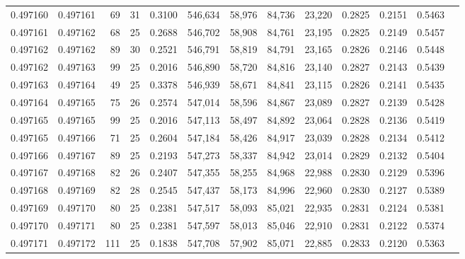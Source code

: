\begin{tabular}{rrrrrrrrrrrrr}
0.497160 & 0.497161 &  69 &  31 &                                     0.3100 & 546,634 &  58,976 &  84,736 &  23,220 & 0.2825 & 0.2151 & 0.5463 \\
0.497161 & 0.497162 &  68 &  25 &                                     0.2688 & 546,702 &  58,908 &  84,761 &  23,195 & 0.2825 & 0.2149 & 0.5457 \\
0.497162 & 0.497162 &  89 &  30 &                                     0.2521 & 546,791 &  58,819 &  84,791 &  23,165 & 0.2826 & 0.2146 & 0.5448 \\
0.497162 & 0.497163 &  99 &  25 &                                     0.2016 & 546,890 &  58,720 &  84,816 &  23,140 & 0.2827 & 0.2143 & 0.5439 \\
0.497163 & 0.497164 &  49 &  25 &                                     0.3378 & 546,939 &  58,671 &  84,841 &  23,115 & 0.2826 & 0.2141 & 0.5435 \\
0.497164 & 0.497165 &  75 &  26 &                                     0.2574 & 547,014 &  58,596 &  84,867 &  23,089 & 0.2827 & 0.2139 & 0.5428 \\
0.497165 & 0.497165 &  99 &  25 &                                     0.2016 & 547,113 &  58,497 &  84,892 &  23,064 & 0.2828 & 0.2136 & 0.5419 \\
0.497165 & 0.497166 &  71 &  25 &                                     0.2604 & 547,184 &  58,426 &  84,917 &  23,039 & 0.2828 & 0.2134 & 0.5412 \\
0.497166 & 0.497167 &  89 &  25 &                                     0.2193 & 547,273 &  58,337 &  84,942 &  23,014 & 0.2829 & 0.2132 & 0.5404 \\
0.497167 & 0.497168 &  82 &  26 &                                     0.2407 & 547,355 &  58,255 &  84,968 &  22,988 & 0.2830 & 0.2129 & 0.5396 \\
0.497168 & 0.497169 &  82 &  28 &                                     0.2545 & 547,437 &  58,173 &  84,996 &  22,960 & 0.2830 & 0.2127 & 0.5389 \\
0.497169 & 0.497170 &  80 &  25 &                                     0.2381 & 547,517 &  58,093 &  85,021 &  22,935 & 0.2831 & 0.2124 & 0.5381 \\
0.497170 & 0.497171 &  80 &  25 &                                     0.2381 & 547,597 &  58,013 &  85,046 &  22,910 & 0.2831 & 0.2122 & 0.5374 \\
0.497171 & 0.497172 & 111 &  25 &                                     0.1838 & 547,708 &  57,902 &  85,071 &  22,885 & 0.2833 & 0.2120 & 0.5363 \\

\end{tabular}

